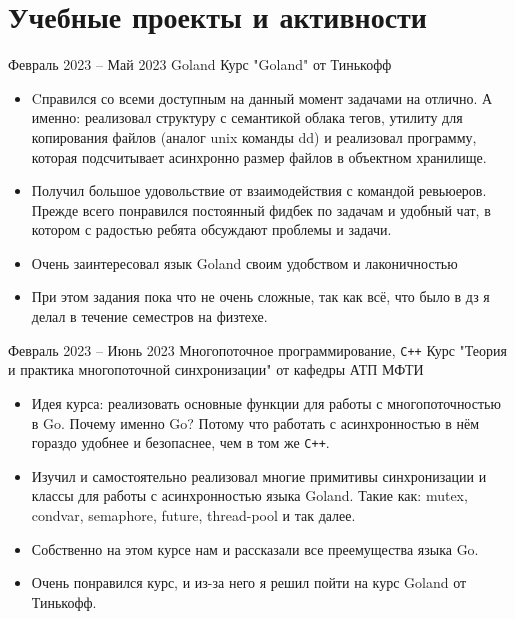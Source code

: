 \section*{Учебные проекты и активности}

\experience
{Февраль 2023 -- Май 2023}
{Goland}
{Курс "Goland" от Тинькофф}
{\begin{itemize}
    \item Cправился со всеми доступным на данный момент задачами на отлично. А именно: реализовал структуру с семантикой облака тегов, утилиту для копирования файлов (аналог unix команды dd) и реализовал программу, которая подсчитывает асинхронно размер файлов в объектном хранилище.
    \item Получил большое удовольствие от взаимодействия с командой ревьюеров. Прежде всего понравился постоянный фидбек по задачам и удобный чат, в котором с радостью ребята обсуждают проблемы и задачи.
    \item Очень заинтересовал язык Goland своим удобством и лаконичностью
    \item При этом задания пока что не очень сложные, так как всё, что было в дз я делал в течение семестров на физтехе. 
\end{itemize}}

\experience
{Февраль 2023 -- Июнь 2023}
{Многопоточное программирование, \texttt{C++}}
{Курс "Теория и практика многопоточной синхронизации" от кафедры АТП МФТИ}
{\begin{itemize}
    \item Идея курса: реализовать основные функции для работы с многопоточностью в Go. Почему именно Go? Потому что работать с асинхронностью в нём гораздо удобнее и безопаснее, чем в том же \texttt{C++}.
    \item Изучил и самостоятельно реализовал многие примитивы синхронизации и классы для работы с асинхронностью языка Goland. Такие как: mutex, condvar, semaphore, future, thread-pool и так далее.
    \item Собственно на этом курсе нам и рассказали все преемущества языка Go.
    \item Очень понравился курс, и из-за него я решил пойти на курс Goland от Тинькофф. 
\end{itemize}}

